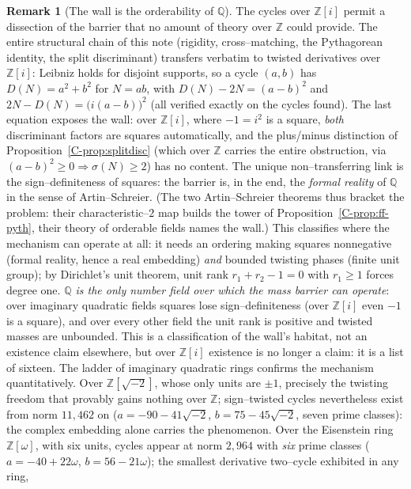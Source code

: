 \documentclass[11pt]{article}
\theoremstyle{definition}
\newtheorem{remark}[theorem]{Remark}
\begin{document}
\begin{remark}[The wall is the orderability of $\mathbb{Q}$]\label{rem:orderable}
The cycles over $\mathbb{Z}[i]$ permit a dissection of the barrier that no amount of theory over
$\mathbb{Z}$ could provide. The entire structural chain of this note (rigidity, cross--matching, the
Pythagorean identity, the split discriminant) transfers verbatim to twisted derivatives over
$\mathbb{Z}[i]$: Leibniz holds for disjoint supports, so a cycle $(a,b)$ has $D(N)=a^2+b^2$ for $N=ab$,
with $D(N)-2N=(a-b)^2$ and $2N-D(N)=\bigl(i(a-b)\bigr)^2$ (all verified exactly on the cycles found).
The last equation exposes the wall: over $\mathbb{Z}[i]$, where $-1=i^2$ is a square, \emph{both}
discriminant factors are squares automatically, and the plus/minus distinction of
Proposition~\ref{C-prop:splitdisc} (which over $\mathbb{Z}$ carries the entire obstruction, via
$(a-b)^2\ge0\Rightarrow\sigma(N)\ge2$) has no content. The unique non--transferring link is the
sign--definiteness of squares: the barrier is, in the end, the \emph{formal reality} of $\mathbb{Q}$ in
the sense of Artin--Schreier. (The two Artin--Schreier theorems thus bracket the problem: their
characteristic--$2$ map builds the tower of Proposition~\ref{C-prop:ff-pyth}, their theory of orderable
fields names the wall.) This classifies where the mechanism can operate at all: it needs an ordering
making squares nonnegative (formal reality, hence a real embedding) \emph{and} bounded twisting phases
(finite unit group); by Dirichlet's unit theorem, unit rank $r_1+r_2-1=0$ with $r_1\ge1$ forces degree
one. \emph{$\mathbb{Q}$ is the only number field over which the mass barrier can operate}: over
imaginary quadratic fields squares lose sign--definiteness (over $\mathbb{Z}[i]$ even $-1$ is a square),
and over every other field the unit rank is positive and twisted masses are unbounded. This is a
classification of the wall's habitat, not an existence claim elsewhere, but over $\mathbb{Z}[i]$
existence is no longer a claim: it is a list of sixteen. The ladder of imaginary quadratic rings
confirms the mechanism quantitatively. Over $\mathbb{Z}[\sqrt{-2}]$, whose only units are $\pm1$,
precisely the twisting freedom that provably gains nothing over $\mathbb{Z}$; sign--twisted cycles
nevertheless exist from norm $11{,}462$ on ($a=-90-41\sqrt{-2}$, $b=75-45\sqrt{-2}$, seven prime
classes): the complex embedding alone carries the phenomenon. Over the Eisenstein ring
$\mathbb{Z}[\omega]$, with six units, cycles appear at norm $2{,}964$ with \emph{six} prime classes
($a=-40+22\omega$, $b=56-21\omega$); the smallest derivative two--cycle exhibited in any ring,

\end{remark}
\end{document}
